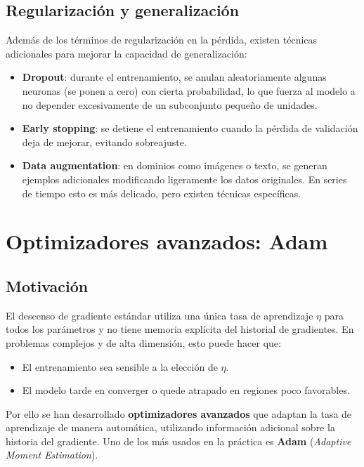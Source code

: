\subsection{Regularización y generalización}

Además de los términos de regularización en la pérdida, existen técnicas adicionales para mejorar la capacidad de generalización:
\begin{itemize}
    \item \textbf{Dropout}: durante el entrenamiento, se anulan aleatoriamente algunas neuronas (se ponen a cero) con cierta probabilidad, lo que fuerza al modelo a no depender excesivamente de un subconjunto pequeño de unidades.
    \item \textbf{Early stopping}: se detiene el entrenamiento cuando la pérdida de validación deja de mejorar, evitando sobreajuste.
    \item \textbf{Data augmentation}: en dominios como imágenes o texto, se generan ejemplos adicionales modificando ligeramente los datos originales. En series de tiempo esto es más delicado, pero existen técnicas específicas.
\end{itemize}

\section{Optimizadores avanzados: Adam}

\subsection{Motivación}

El descenso de gradiente estándar utiliza una única tasa de aprendizaje $\eta$ para todos los parámetros y no tiene memoria explícita del historial de gradientes. En problemas complejos y de alta dimensión, esto puede hacer que:
\begin{itemize}
    \item El entrenamiento sea sensible a la elección de $\eta$.
    \item El modelo tarde en converger o quede atrapado en regiones poco favorables.
\end{itemize}

Por ello se han desarrollado \textbf{optimizadores avanzados} que adaptan la tasa de aprendizaje de manera automática, utilizando información adicional sobre la historia del gradiente. Uno de los más usados en la práctica es \textbf{Adam} (\textit{Adaptive Moment Estimation}).

